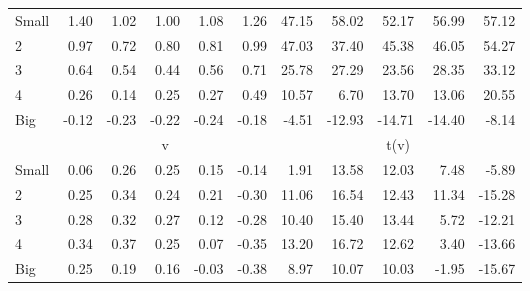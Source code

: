 \begin{table}[!ht]
\begin{tabular}{lrrrrrrrrrr}
    \\
      \cmidrule(r){2-6} \cmidrule(r){7-11}

    Small   & 1.40  & 1.02  & 1.00  & 1.08  & 1.26  & 47.15  & 58.02  & 52.17  & 56.99  & 57.12  \\
         2  & 0.97  & 0.72  & 0.80  & 0.81  & 0.99  & 47.03  & 37.40  & 45.38  & 46.05  & 54.27  \\
         3  & 0.64  & 0.54  & 0.44  & 0.56  & 0.71  & 25.78  & 27.29  & 23.56  & 28.35  & 33.12  \\
         4  & 0.26  & 0.14  & 0.25  & 0.27  & 0.49  & 10.57  & 6.70  & 13.70  & 13.06  & 20.55  \\
    Big     & -0.12  & -0.23  & -0.22  & -0.24  & -0.18  & -4.51  & -12.93  & -14.71  & -14.40  & -8.14  \\

  
    
      & \multicolumn{5}{c}{v} & \multicolumn{5}{c}{t(v)}
    
    \\
      \cmidrule(r){2-6} \cmidrule(r){7-11}

    Small   & 0.06  & 0.26  & 0.25  & 0.15  & -0.14  & 1.91  & 13.58  & 12.03  & 7.48  & -5.89  \\
         2  & 0.25  & 0.34  & 0.24  & 0.21  & -0.30  & 11.06  & 16.54  & 12.43  & 11.34  & -15.28  \\
         3  & 0.28  & 0.32  & 0.27  & 0.12  & -0.28  & 10.40  & 15.40  & 13.44  & 5.72  & -12.21  \\
         4  & 0.34  & 0.37  & 0.25  & 0.07  & -0.35  & 13.20  & 16.72  & 12.62  & 3.40  & -13.66  \\
    Big     & 0.25  & 0.19  & 0.16  & -0.03  & -0.38  & 8.97  & 10.07  & 10.03  & -1.95  & -15.67  \\

  

  \bottomrule
\end{tabular}
\label{tbl:25_Size_Inv_F93}
\end{table}